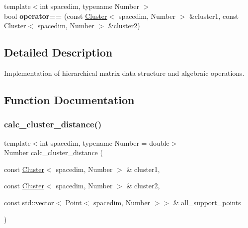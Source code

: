 \begin{DoxyCompactItemize}
\item 
\mbox{\label{group__hierarchical__matrices_gacb7726d12648a539547a7520c6b699e9}} 
{\footnotesize template$<$int spacedim, typename Number $>$ }\\bool {\bfseries operator==} (const \hyperlink{classCluster}{Cluster}$<$ spacedim, Number $>$ \&cluster1, const \hyperlink{classCluster}{Cluster}$<$ spacedim, Number $>$ \&cluster2)
\end{DoxyCompactItemize}


\subsection{Detailed Description}
Implementation of hierarchical matrix data structure and algebraic operations. 



\subsection{Function Documentation}
\mbox{\label{group__hierarchical__matrices_gab6b0a51fb1b117f29902d220df72420a}} 
\subsubsection{\texorpdfstring{calc\+\_\+cluster\+\_\+distance()}{calc\_cluster\_distance()}\hspace{0.1cm}{\footnotesize\ttfamily [1/2]}}
{\footnotesize\ttfamily template$<$int spacedim, typename Number  = double$>$ \\
Number calc\+\_\+cluster\+\_\+distance (\begin{DoxyParamCaption}\item[{const \hyperlink{classCluster}{Cluster}$<$ spacedim, Number $>$ \&}]{cluster1,  }\item[{const \hyperlink{classCluster}{Cluster}$<$ spacedim, Number $>$ \&}]{cluster2,  }\item[{const std\+::vector$<$ Point$<$ spacedim, Number $>$$>$ \&}]{all\+\_\+support\+\_\+points }\end{DoxyParamCaption})}

